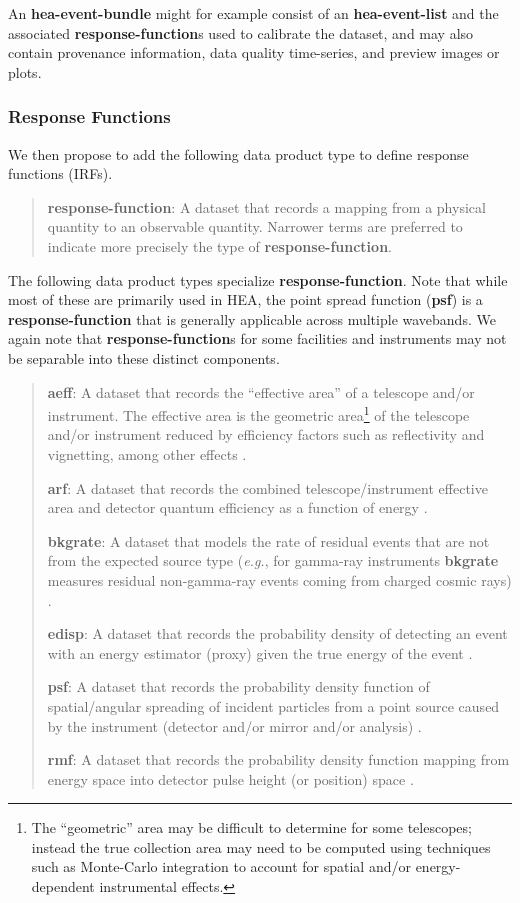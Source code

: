 \documentclass[11pt,a4paper]{ivoa}
\begin{document}
An {\bf hea-event-bundle} might for example consist of an {\bf hea-event-list} and the associated {\bf response-function}s used to calibrate the dataset, and may also contain provenance information, data quality time-series, and preview images or plots.


\subsubsection{Response Functions}
\label{sec:responsefct}

We then propose to add the following data product type to define response functions (\glspl{IRF}).

\begin{quote}
 {\bf response-function}: A dataset that records a mapping from a physical quantity to an observable quantity.  Narrower terms are preferred to indicate more precisely the type of {\bf response-function}.
 \end{quote}

The following data product types specialize {\bf response-function}.  Note that while most of these are primarily used in \gls{HEA}, the point spread function ({\bf psf}) is a {\bf response-function} that is generally applicable across multiple wavebands.  We again note that {\bf response-function}s for some facilities and instruments may not be separable into these distinct components.

\begin{quote}
{\bf aeff}: A dataset that records the ``effective area'' of a telescope and/or instrument.  The effective area is the geometric area\footnote{The ``geometric'' area may be difficult to determine for some telescopes; instead the true collection area may need to be computed using techniques such as Monte-Carlo integration to account for spatial and/or energy-dependent instrumental effects.} of the telescope and/or instrument reduced by efficiency factors such as reflectivity and vignetting, among other effects \citep{deil_2022_7304668}.

{\bf arf}: A dataset that records the combined telescope/instrument effective area and detector quantum efficiency as a function of energy \citep{ogip_spectrum_1998}.

{\bf bkgrate}: A dataset that models the rate of residual events that are not from the expected source type ({\em e.g.\/}, for gamma-ray instruments {\bf bkgrate} measures residual non-gamma-ray events coming from charged cosmic rays)  \citep{deil_2022_7304668}.

{\bf edisp}: A dataset that records the probability density of detecting an event with an energy estimator (proxy) given the true energy of the event \citep{deil_2022_7304668}.

{\bf psf}: A dataset that records the probability density function of spatial/angular spreading of incident particles from a point source caused by the instrument (detector and/or mirror and/or analysis) \citep{deil_2022_7304668, ogip_psf_2011}.

{\bf rmf}: A dataset that records the probability density function mapping from energy space into detector pulse height (or position) space \citep{ogip_spectrum_1998}.
\end{quote}
\end{document}
